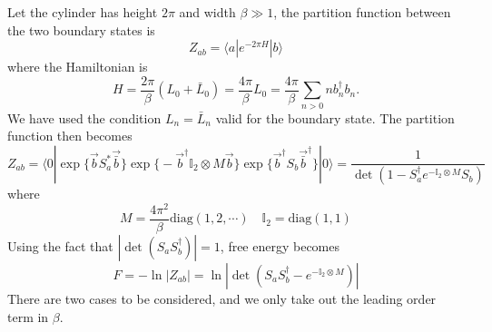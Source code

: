 Let the cylinder has height $2\pi$ and width $\beta \gg 1 $, the partition function between the two boundary states is
\begin{equation}
Z_{ab} =  \langle a | e^{ - 2\pi H } |b \rangle 
\end{equation}
where the Hamiltonian is
\begin{equation}
H = \frac{2\pi}{\beta} (L_0 + \bar{L}_0) =  \frac{4\pi}{\beta}  L_0 = \frac{4\pi}{\beta}\sum_{n > 0 }  n b_n^{\dagger} b_n. 
\end{equation}
We have used the condition $L_n = \bar{L}_n$ valid for the boundary state. The partition function then becomes
\begin{equation}
Z_{ab} = \langle 0 | \exp\Big\{ \vec{b} S_a^* \vec{\bar{b}}\Big\} \exp\Big\{ - \vec{b}^{\dagger} \mathbb{I}_2 \otimes M  \vec{b} \Big\}   \exp\Big\{  \vec{b}^{\dagger} S_b  \vec{\bar{b}}^{\dagger}\Big\}  |0  \rangle  = \frac{1}{\det ( 1 - S^{\dagger} _a  e^{- \mathbb{I}_2 \otimes M} S_b) }
\end{equation}
where
\begin{equation}
M =  \frac{4\pi^2}{\beta} \text{diag}( 1, 2, \cdots ) \quad  \mathbb{I}_2 = \text{diag}( 1, 1) 
\end{equation}
Using the fact that $|\det( S_a S_b^{\dagger})|  = 1$, free energy becomes
\begin{equation}
F = - \ln |Z_{ab}| = \ln |\det ( S_a S_b^{\dagger} - e^{- \mathbb{I}_2 \otimes M} )|
\end{equation}
There are two cases to be considered, and we only take out the leading order term in $\beta$. 
